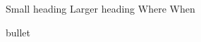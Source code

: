 \begin{cventries}
  \cventry
    {Small heading}
    {Larger heading}
    {Where}
    {When}
    {
      \begin{cvitems}
        \item {bullet}
      \end{cvitems}
    }
  
\end{cventries}
